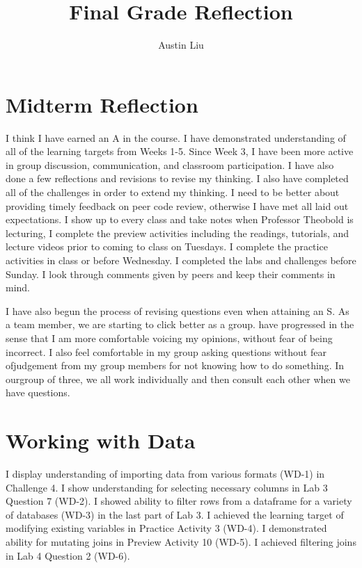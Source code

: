 \documentclass[
  letterpaper,
  DIV=11,
  numbers=noendperiod]{scrartcl}
\title{Final Grade Reflection}
\author{Austin Liu}
\date{}
\begin{document}
\maketitle
\ifdefined\Shaded\renewenvironment{Shaded}{\begin{tcolorbox}[borderline west={3pt}{0pt}{shadecolor}, enhanced, boxrule=0pt, sharp corners, interior hidden, frame hidden, breakable]}{\end{tcolorbox}}\fi

\hypertarget{midterm-reflection}{%
\section{Midterm Reflection}\label{midterm-reflection}}

I think I have earned an A in the course. I have demonstrated
understanding of all of the learning targets from Weeks 1-5. Since Week
3, I have been more active in group discussion, communication, and
classroom participation. I have also done a few reflections and
revisions to revise my thinking. I also have completed all of the
challenges in order to extend my thinking. I need to be better about
providing timely feedback on peer code review, otherwise I have met all
laid out expectations. I show up to every class and take notes when
Professor Theobold is lecturing, I complete the preview activities
including the readings, tutorials, and lecture videos prior to coming to
class on Tuesdays. I complete the practice activities in class or before
Wednesday. I completed the labs and challenges before Sunday. I look
through comments given by peers and keep their comments in mind.

I have also begun the process of revising questions even when attaining
an S. As a team member, we are starting to click better as a group. have
progressed in the sense that I am more comfortable voicing my opinions,
without fear of being incorrect. I also feel comfortable in my group
asking questions without fear ofjudgement from my group members for not
knowing how to do something. In ourgroup of three, we all work
individually and then consult each other when we have questions.

\hypertarget{working-with-data}{%
\section{Working with Data}\label{working-with-data}}

I display understanding of importing data from various formats (WD-1) in
Challenge 4. I show understanding for selecting necessary columns in Lab
3 Question 7 (WD-2). I showed ability to filter rows from a dataframe
for a variety of databases (WD-3) in the last part of Lab 3. I achieved
the learning target of modifying existing variables in Practice Activity
3 (WD-4). I demonstrated ability for mutating joins in Preview Activity
10 (WD-5). I achieved filtering joins in Lab 4 Question 2 (WD-6).
\end{document}
